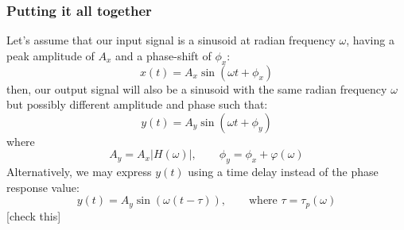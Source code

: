 \subsubsection{Putting it all together} 
Let's assume that our input signal is a sinusoid at radian frequency $\omega$, having a peak amplitude of $A_x$ and a phase-shift of $\phi_x$: \begin{equation}
 x(t) = A_x \sin(\omega t + \phi_x)
\end{equation} 
then, our output signal will also be a sinusoid with the same radian frequency $\omega$ but possibly different amplitude and phase such that:
\begin{equation}
 y(t) = A_y \sin(\omega t + \phi_y)
\end{equation} 
where
\begin{equation}
 A_y = A_x |H(\omega)|, \qquad \phi_y = \phi_x + \varphi(\omega)
\end{equation} 
Alternatively, we may express $y(t)$ using a time delay instead of the phase response value:
\begin{equation}
 y(t) = A_y \sin(\omega (t - \tau) ), \qquad \text{where } \tau = \tau_p(\omega)
\end{equation} 
[check this]





















